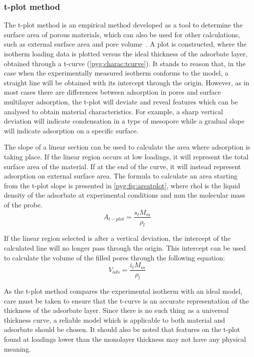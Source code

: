 \subsubsection{t-plot method}\label{pyg:charac:tplot}

The t-plot method is an empirical method developed as a
tool to determine the surface area of porous materials,
which can also be used for other calculations, such as
external surface area and pore volume~\cite{lippensStudiesPoreSystems1965}.
A plot is constructed, where the isotherm loading
data is plotted versus the ideal thickness of the adsorbate layer,
obtained through a t-curve (\autoref{pyg:charac:tcurve}).
It stands to reason that, in the case when the experimentally measured
isotherm conforms to the model, a straight line will be obtained with its
intercept through the origin. However, as in most cases there
are differences between adsorption in pores and surface multilayer
adsorption, the t-plot will deviate and reveal features which can
be analysed to obtain material characteristics. For example, a sharp
vertical deviation will indicate condensation in a type of mesopore
while a gradual slope will indicate adsorption on a specific surface.

The slope of a linear section can be used to calculate the area where
adsorption is taking place. If the linear region occurs at low loadings,
it will represent the total surface area of the material.
If at the end of the curve, it will instead represent adsorption on
external surface area. The formula to calculate an area starting
from the t-plot slope is presented in \autoref{pyg:fig:areatplot},
where \gls{rhol} is the liquid density of the adsorbate at experimental
conditions and \gls{mm} the molecular mass of the probe.
%
\begin{equation}\label{pyg:fig:areatplot}
	A_{t-plot} = \frac{s_t M_m}{\rho_{l}}
\end{equation}

If the linear region selected is after a vertical deviation,
the intercept of the calculated line will no longer pass through
the origin. This intercept can be used to calculate the volume of
the filled pores through the following equation:
%
\begin{equation}
	V_{ads} = \frac{i_t M_m}{\rho_{l}}
\end{equation}

As the t-plot method compares the experimental isotherm
with an ideal model, care must be taken to ensure that the t-curve
is an accurate representation of the thickness of the adsorbate layer.
Since there is no such thing as a universal thickness curve,
a reliable model which is applicable to both material and adsorbate
should be chosen. It should also be noted that features on the t-plot
found at loadings lower than the monolayer thickness may not have any
physical meaning.

